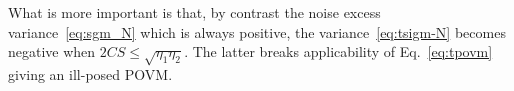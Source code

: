 \documentclass[%
reprint,
superscriptaddress,
 amsmath,amssymb,amsfonts,
 aps,
 pra,
 longbibliography
]{revtex4-2}
\newcommand{\avr}[1]{\ensuremath{\langle{#1}\rangle}}
\begin{document}
What is more important is
that, by contrast the noise excess variance~\eqref{eq:sgm_N}
which is always positive,
the variance~\eqref{eq:tsigm-N} becomes negative
when $2CS\le \sqrt{\eta_1\eta_2}$.
The latter breaks applicability of Eq.~\eqref{eq:tpovm}
giving an ill-posed POVM.









%

\end{document}
